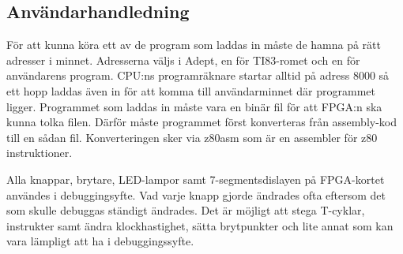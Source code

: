 \documentclass[main.tex]{subfiles}
\begin{document}
\subsection{Användarhandledning}
För att kunna köra ett av de program som laddas in måste de hamna på rätt
adresser i minnet. Adresserna väljs i Adept, en för TI83-romet och en för
användarens program. CPU:ns programräknare startar alltid på adress 8000 så ett
hopp laddas även in för att komma till användarminnet där programmet ligger.
Programmet som laddas in måste vara en binär fil för att FPGA:n ska kunna tolka
filen. Därför måste programmet först konverteras från assembly-kod till en
sådan fil. Konverteringen sker via z80asm som är en assembler för z80
instruktioner.

Alla knappar, brytare, LED-lampor samt 7-segmentsdislayen på FPGA-kortet
användes i debuggingsyfte. Vad varje knapp gjorde ändrades ofta eftersom det
som skulle debuggas ständigt ändrades. Det är möjligt att stega T-cyklar,
instrukter samt ändra klockhastighet, sätta brytpunkter och lite annat som kan
vara lämpligt att ha i debuggingssyfte.

\clearpage
\end{document}
